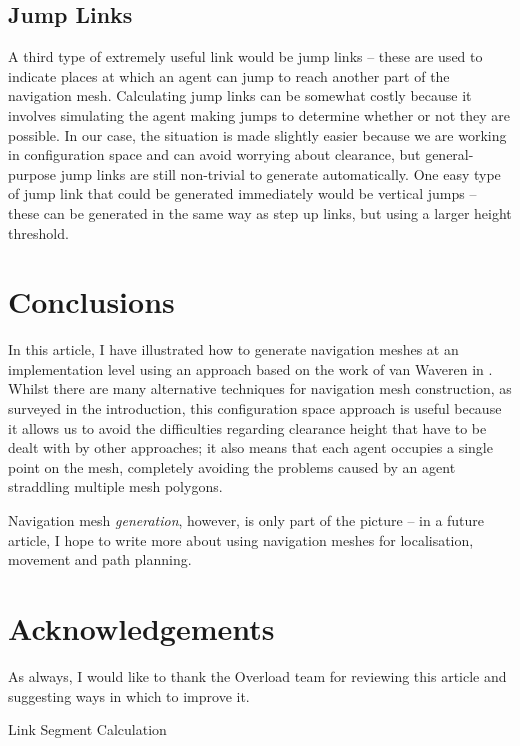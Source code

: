 \documentclass[10pt,twocolumn]{article}
\begin{document}
\subsection{Jump Links}

A third type of extremely useful link would be jump links -- these are used to indicate places at which an agent can jump to reach another part of the navigation mesh. Calculating jump links can be somewhat costly because it involves simulating the agent making jumps to determine whether or not they are possible. In our case, the situation is made slightly easier because we are working in configuration space and can avoid worrying about clearance, but general-purpose jump links are still non-trivial to generate automatically. One easy type of jump link that could be generated immediately would be vertical jumps -- these can be generated in the same way as step up links, but using a larger height threshold.

\section{Conclusions}

In this article, I have illustrated how to generate navigation meshes at an implementation level using an approach based on the work of van Waveren in \cite{vanwaveren01}. Whilst there are many alternative techniques for navigation mesh construction, as surveyed in the introduction, this configuration space approach is useful because it allows us to avoid the difficulties regarding clearance height that have to be dealt with by other approaches; it also means that each agent occupies a single point on the mesh, completely avoiding the problems caused by an agent straddling multiple mesh polygons.

Navigation mesh \emph{generation}, however, is only part of the picture -- in a future article, I hope to write more about using navigation meshes for localisation, movement and path planning.

\section{Acknowledgements}

As always, I would like to thank the Overload team for reviewing this article and suggesting ways in which to improve it.

\begin{stulisting}[!t]
\caption{Link Segment Calculation}
\label{code:linksegment-calculation}

\end{stulisting}

\clearpage



\end{document}
